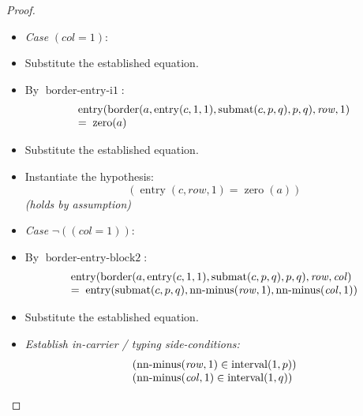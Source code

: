 \documentclass[11pt]{article}
\theoremstyle{plain}
\begin{document}
\begin{proof}
\begin{itemize}[leftmargin=2.8em, itemsep=4pt, parsep=1pt]
  \item[]\emph{Case} $(\mathit{col} = 1)$:
  \item[\textbf{68}] Substitute the established equation.
  \item[\textbf{69}] By $\operatorname{border\text{-}entry\text{-}i1}$:
\begin{equation*}
\begin{array}{@{}l@{}} \operatorname{entry}(\operatorname{border}(a, \operatorname{entry}(c, 1, 1), \operatorname{submat}(c, p, q), p, q), \mathit{row}, 1) \\ =\; \operatorname{zero}(a) \end{array}
\end{equation*}

  \item[\textbf{70}] Substitute the established equation.
  \item[\textbf{71--72}] Instantiate the hypothesis:
\begin{equation*}
(\operatorname{entry}(c, \mathit{row}, 1) = \operatorname{zero}(a))
\end{equation*}
  \emph{(holds by assumption)}
  \item[]\emph{Case} $\lnot((\mathit{col} = 1))$:
  \item[\textbf{73}] By $\operatorname{border\text{-}entry\text{-}block2}$:
\begin{equation*}
\begin{array}{@{}l@{}} \operatorname{entry}(\operatorname{border}(a, \operatorname{entry}(c, 1, 1), \operatorname{submat}(c, p, q), p, q), \mathit{row}, \mathit{col}) \\ =\; \operatorname{entry}(\operatorname{submat}(c, p, q), \operatorname{nn\text{-}minus}(\mathit{row}, 1), \operatorname{nn\text{-}minus}(\mathit{col}, 1)) \end{array}
\end{equation*}

  \item[\textbf{74}] Substitute the established equation.
  \item[\textbf{75--76}] \emph{Establish in-carrier / typing side-conditions:}
\begin{equation*}
\begin{array}{@{}l@{}}
(\operatorname{nn\text{-}minus}(\mathit{row}, 1) \in \operatorname{interval}(1, p)) \\
(\operatorname{nn\text{-}minus}(\mathit{col}, 1) \in \operatorname{interval}(1, q))
\end{array}
\end{equation*}


\end{itemize}
\end{proof}
\end{document}

